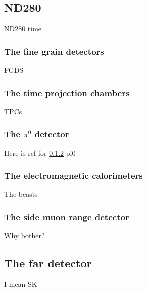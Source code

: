 \subsection{ND280}
\label{subsec:ND280}
ND280 time

\subsubsection{The fine grain detectors}
\label{subsubsec:FGD}
FGDS

\subsubsection{The time projection chambers}
\label{subsubsec:TPC}
TPCs

\subsubsection{The $\pi^0$ detector}
\label{subsubsec:pi0detector}
Here is ref for \ref{subsubsec:TPC}
pi0

\subsubsection{The electromagnetic calorimeters}
\label{subsubsec:ecal}
The beasts

\subsubsection{The side muon range detector}
\label{subsubsec:smrd}
Why bother?

\subsection{The far detector}
I mean SK



